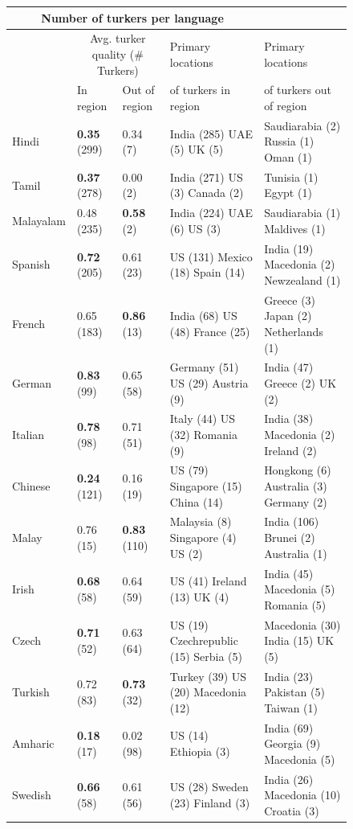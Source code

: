 \documentclass[11pt]{article}
\begin{document}
\begin{figure}[h]
\footnotesize
\begin{tabular}{lllll}
\multicolumn{4}{c}{Number of turkers per language}\\
\hline\hline
&\multicolumn{2}{c}{Avg. turker quality (\# Turkers)}&Primary locations&Primary locations\\
&In region&Out of region&of turkers in region&of turkers out of region\\
\hline\hline
Hindi&\textbf{0.35} (299)&0.34 (7)&India (285) UAE (5) UK (5) &Saudiarabia (2) Russia (1) Oman (1) \\
Tamil&\textbf{0.37} (278)&0.00 (2)&India (271) US (3) Canada (2) &Tunisia (1) Egypt (1) \\
Malayalam&0.48 (235) &\textbf{0.58} (2)&India (224) UAE (6) US (3) &Saudiarabia (1) Maldives (1) \\
Spanish&\textbf{0.72} (205)&0.61 (23)&US (131) Mexico (18) Spain (14) &India (19) Macedonia (2) Newzealand (1) \\
French&0.65 (183) &\textbf{0.86} (13)&India (68) US (48) France (25) &Greece (3) Japan (2) Netherlands (1) \\
German&\textbf{0.83} (99)&0.65 (58)&Germany (51) US (29) Austria (9) &India (47) Greece (2) UK (2) \\
Italian&\textbf{0.78} (98)&0.71 (51)&Italy (44) US (32) Romania (9) &India (38) Macedonia (2) Ireland (2) \\
Chinese&\textbf{0.24} (121)&0.16 (19)&US (79) Singapore (15) China (14) &Hongkong (6) Australia (3) Germany (2) \\
Malay&0.76 (15) &\textbf{0.83} (110)&Malaysia (8) Singapore (4) US (2) &India (106) Brunei (2) Australia (1) \\
Irish&\textbf{0.68} (58)&0.64 (59)&US (41) Ireland (13) UK (4) &India (45) Macedonia (5) Romania (5) \\
Czech&\textbf{0.71} (52)&0.63 (64)&US (19) Czechrepublic (15) Serbia (5) &Macedonia (30) India (15) UK (5) \\
Turkish&0.72 (83) &\textbf{0.73} (32)&Turkey (39) US (20) Macedonia (12) &India (23) Pakistan (5) Taiwan (1) \\
Amharic&\textbf{0.18} (17)&0.02 (98)&US (14) Ethiopia (3) &India (69) Georgia (9) Macedonia (5) \\
Swedish&\textbf{0.66} (58)&0.61 (56)&US (28) Sweden (23) Finland (3) &India (26) Macedonia (10) Croatia (3) \\

\end{tabular}
\end{figure}
\end{document}
